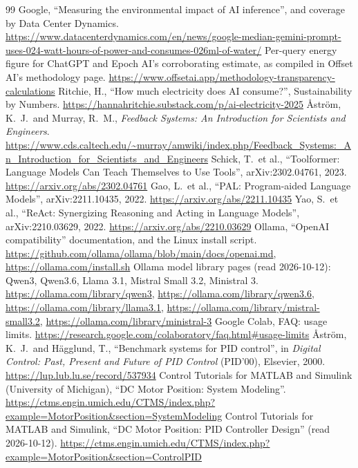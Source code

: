 \documentclass[a4paper,11pt]{article}
\begin{document}
\begin{thebibliography}{99}
 Google, ``Measuring the environmental impact of AI inference'', and coverage by Data Center Dynamics. \url{https://www.datacenterdynamics.com/en/news/google-median-gemini-prompt-uses-024-watt-hours-of-power-and-consumes-026ml-of-water/}
 Per-query energy figure for ChatGPT and Epoch AI's corroborating estimate, as compiled in Offset AI's methodology page. \url{https://www.offsetai.app/methodology-transparency-calculations}
 Ritchie, H., ``How much electricity does AI consume?'', Sustainability by Numbers. \url{https://hannahritchie.substack.com/p/ai-electricity-2025}
 \AA str\"om, K.~J.\ and Murray, R.~M., \emph{Feedback Systems: An Introduction for Scientists and Engineers}. \url{https://www.cds.caltech.edu/~murray/amwiki/index.php/Feedback_Systems:_An_Introduction_for_Scientists_and_Engineers}
 Schick, T.\ et al., ``Toolformer: Language Models Can Teach Themselves to Use Tools'', arXiv:2302.04761, 2023. \url{https://arxiv.org/abs/2302.04761}
 Gao, L.\ et al., ``PAL: Program-aided Language Models'', arXiv:2211.10435, 2022. \url{https://arxiv.org/abs/2211.10435}
 Yao, S.\ et al., ``ReAct: Synergizing Reasoning and Acting in Language Models'', arXiv:2210.03629, 2022. \url{https://arxiv.org/abs/2210.03629}
 Ollama, ``OpenAI compatibility'' documentation, and the Linux install script. \url{https://github.com/ollama/ollama/blob/main/docs/openai.md}, \url{https://ollama.com/install.sh}
 Ollama model library pages (read 2026-10-12): Qwen3, Qwen3.6, Llama 3.1, Mistral Small 3.2, Ministral 3. \url{https://ollama.com/library/qwen3}, \url{https://ollama.com/library/qwen3.6}, \url{https://ollama.com/library/llama3.1}, \url{https://ollama.com/library/mistral-small3.2}, \url{https://ollama.com/library/ministral-3}
 Google Colab, FAQ: usage limits. \url{https://research.google.com/colaboratory/faq.html#usage-limits}
 \AA str\"om, K.~J.\ and H\"agglund, T., ``Benchmark systems for PID control'', in \emph{Digital Control: Past, Present and Future of PID Control} (PID'00), Elsevier, 2000. \url{https://lup.lub.lu.se/record/537934}
 Control Tutorials for MATLAB and Simulink (University of Michigan), ``DC Motor Position: System Modeling''. \url{https://ctms.engin.umich.edu/CTMS/index.php?example=MotorPosition&section=SystemModeling}
 Control Tutorials for MATLAB and Simulink, ``DC Motor Position: PID Controller Design'' (read 2026-10-12). \url{https://ctms.engin.umich.edu/CTMS/index.php?example=MotorPosition&section=ControlPID}

\end{thebibliography}
\end{document}
